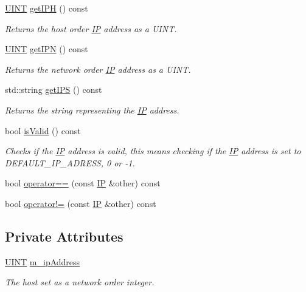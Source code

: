 \begin{DoxyCompactItemize}
\hyperlink{typedefs_8h_a2e2c38961834f28c06e17e074eb00bc7}{U\+I\+N\+T} \hyperlink{class_communication_1_1_i_p_a4d27a1a6564af4cfe32efad64bff1782}{get\+I\+P\+H} () const 
\begin{DoxyCompactList}\small\item\em Returns the host order \hyperlink{class_communication_1_1_i_p}{I\+P} address as a U\+I\+N\+T. \end{DoxyCompactList}\item 
\hyperlink{typedefs_8h_a2e2c38961834f28c06e17e074eb00bc7}{U\+I\+N\+T} \hyperlink{class_communication_1_1_i_p_acc518ec890e42d67fe93840c31ed0b27}{get\+I\+P\+N} () const 
\begin{DoxyCompactList}\small\item\em Returns the network order \hyperlink{class_communication_1_1_i_p}{I\+P} address as a U\+I\+N\+T. \end{DoxyCompactList}\item 
std\+::string \hyperlink{class_communication_1_1_i_p_a0cfc93cc3418241b854ee38b7db70782}{get\+I\+P\+S} () const 
\begin{DoxyCompactList}\small\item\em Returns the string representing the \hyperlink{class_communication_1_1_i_p}{I\+P} address. \end{DoxyCompactList}\item 
bool \hyperlink{class_communication_1_1_i_p_a97cd2b1b9aa2d7694b1ed5009686db2b}{is\+Valid} () const 
\begin{DoxyCompactList}\small\item\em Checks if the \hyperlink{class_communication_1_1_i_p}{I\+P} address is valid, this means checking if the \hyperlink{class_communication_1_1_i_p}{I\+P} address is set to D\+E\+F\+A\+U\+L\+T\+\_\+\+I\+P\+\_\+\+A\+D\+R\+E\+S\+S, 0 or -\/1. \end{DoxyCompactList}\item 
bool \hyperlink{class_communication_1_1_i_p_a8977a1b0be96d90438675852f953092d}{operator==} (const \hyperlink{class_communication_1_1_i_p}{I\+P} \&other) const 
\item 
bool \hyperlink{class_communication_1_1_i_p_a3502e1435ed11a6e32b337f6b5bbce33}{operator!=} (const \hyperlink{class_communication_1_1_i_p}{I\+P} \&other) const 
\end{DoxyCompactItemize}
\subsection*{Private Attributes}
\begin{DoxyCompactItemize}
\item 
\hyperlink{typedefs_8h_a2e2c38961834f28c06e17e074eb00bc7}{U\+I\+N\+T} \hyperlink{class_communication_1_1_i_p_aeb8f550723eb60248dce5638e177d3da}{m\+\_\+ip\+Address}
\begin{DoxyCompactList}\small\item\em The host set as a network order integer. \end{DoxyCompactList}\end{DoxyCompactItemize}


